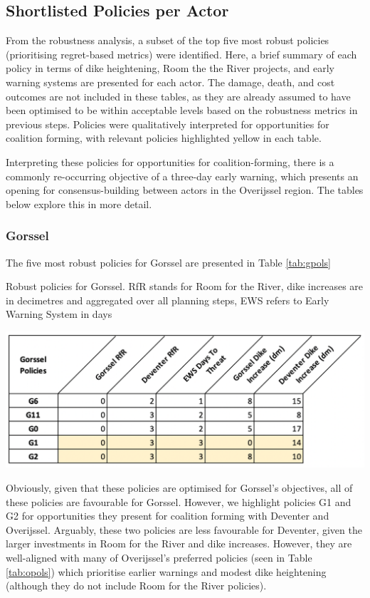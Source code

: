 \subsection{Shortlisted Policies per Actor}
From the robustness analysis, a subset of the top five most robust policies (prioritising regret-based metrics) were identified. Here, a brief summary of each policy in terms of dike heightening, Room the the River projects, and early warning systems are presented for each actor. The damage, death, and cost outcomes are not included in these tables, as they are already assumed to have been optimised to be within acceptable levels based on the robustness metrics in previous steps. Policies were qualitatively interpreted for opportunities for coalition forming, with relevant policies highlighted yellow in each table.

Interpreting these policies for opportunities for coalition-forming, there is a commonly re-occurring objective of a three-day early warning, which presents an opening for consensus-building between actors in the Overijssel region. The tables below explore this in more detail.

\subsubsection{Gorssel}
The five most robust policies for Gorssel are presented in Table \ref{tab:gpols}

\begin{table}[h!]
  \centering
  \captionsetup{justification=centering,margin=2cm}
  \caption{Robust policies for Gorssel. RfR stands for Room for the River, dike increases are in decimetres and aggregated over all planning steps, EWS refers to Early Warning System in days}
  \label{tab:gpols}
  \includegraphics[width=0.8\linewidth]{report/figures/gpols.png}
\end{table}

\noindent Obviously, given that these policies are optimised for Gorssel's objectives, all of these policies are favourable for Gorssel. However, we highlight policies G1 and G2 for opportunities they present for coalition forming with Deventer and Overijssel. Arguably, these two policies are less favourable for Deventer, given the larger investments in Room for the River and dike increases. However, they are well-aligned with many of Overijssel's preferred policies (seen in Table \ref{tab:opols}) which prioritise earlier warnings and modest dike heightening (although they do not include Room for the River policies).

